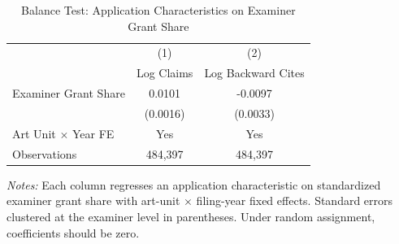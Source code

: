 \begin{table}[htbp]
\centering
\caption{Balance Test: Application Characteristics on Examiner Grant Share}
\label{tab:balance}
\begin{tabular}{lcc}
\hline\hline
 & (1) & (2) \\
 & Log Claims & Log Backward Cites \\
\hline
Examiner Grant Share & 0.0101 & -0.0097 \\
 & (0.0016) & (0.0033) \\
Art Unit $\times$ Year FE & Yes & Yes \\
Observations & 484,397 & 484,397 \\
\hline\hline
\end{tabular}
\begin{minipage}{0.8\textwidth}
\footnotesize
\textit{Notes:} Each column regresses an application characteristic on standardized examiner grant share with art-unit $\times$ filing-year fixed effects. Standard errors clustered at the examiner level in parentheses. Under random assignment, coefficients should be zero.
\end{minipage}
\end{table}
